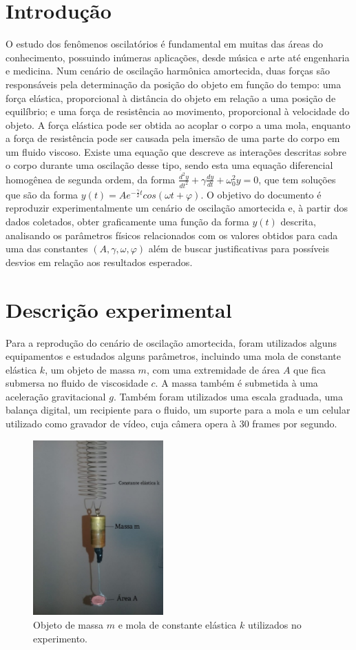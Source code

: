 \documentclass[12pt]{article}
\begin{document}
	\section*{Introdução}
		O estudo dos fenômenos oscilatórios é fundamental em muitas das áreas do conhecimento, possuindo inúmeras aplicações, desde música e arte até engenharia e medicina. Num cenário de oscilação harmônica amortecida, duas forças são responsáveis pela determinação da posição do objeto em função do tempo: uma força elástica, proporcional à distância do objeto em relação a uma posição de equilíbrio; e uma força de resistência ao movimento, proporcional à velocidade do objeto. A força elástica pode ser obtida ao acoplar o corpo a uma mola, enquanto a força de resistência pode ser causada pela imersão de uma parte do corpo em um fluido viscoso. Existe uma equação que descreve as interações descritas sobre o corpo durante uma oscilação desse tipo, sendo esta uma equação diferencial homogênea de segunda ordem, da forma $\frac{d^2y}{dt^2}+\gamma\frac{dy}{dt}+\omega_0^2y=0$, que tem soluções que são da forma $y(t)=Ae^{-\frac{\gamma}{2}t}cos(\omega t+ \varphi)$. O objetivo do documento é reproduzir experimentalmente um cenário de oscilação amortecida e, à partir dos dados coletados, obter graficamente uma função da forma $y(t)$ descrita, analisando os parâmetros físicos relacionados com os valores obtidos para cada uma das constantes $(A,\gamma ,\omega, \varphi)$ além de buscar justificativas para possíveis desvios em relação aos resultados esperados.

	\section*{Descrição experimental}
		
		Para a reprodução do cenário de oscilação amortecida, foram utilizados alguns equipamentos e estudados alguns parâmetros, incluindo uma mola de constante elástica $k$, um objeto de massa $m$, com uma extremidade de área $A$ que fica submersa no fluido de viscosidade $c$. A massa também é submetida à uma aceleração gravitacional $g$. Também foram utilizados uma escala graduada, uma balança digital, um recipiente para o fluido, um suporte para a mola e um celular utilizado como gravador de vídeo, cuja câmera opera à $30$ frames por segundo.
				
		\begin{figure}[H]
			\centering
			\includegraphics[width=5cm]{imagem_1.png}
			\caption{Objeto de massa $m$ e mola de constante elástica $k$ utilizados no experimento.}
			\label{fig:figura1}
		\end{figure}
	
\end{document}
